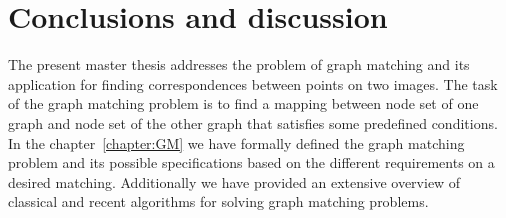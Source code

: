 \chapter{Conclusions and discussion} \label{chapter:conclusions}

The present master thesis addresses the problem of graph matching and its application for finding correspondences between points on two images. The task of the graph matching problem is to find a mapping between node set of one graph and node set of the other graph that satisfies some predefined conditions. In the chapter~\ref{chapter:GM} we have formally defined the graph matching problem and its possible specifications based on the different requirements on a desired matching. Additionally we have provided an extensive overview of classical and recent algorithms for solving graph matching problems. 

